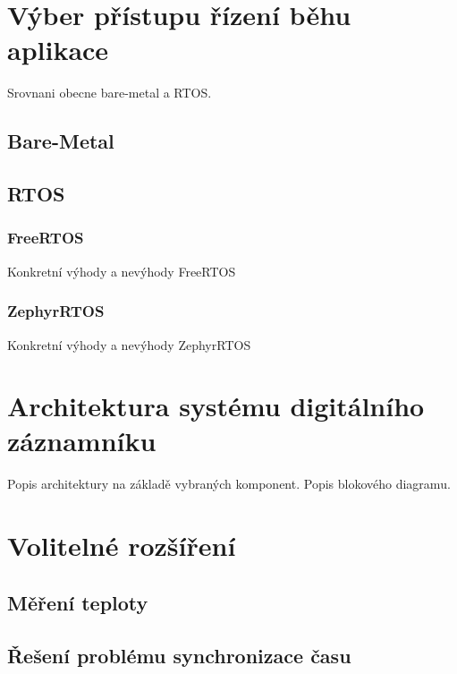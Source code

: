 \section{Výber přístupu řízení běhu aplikace}
Srovnani obecne bare-metal a RTOS.


\subsection{Bare-Metal}

\subsection{RTOS}
\subsubsection{FreeRTOS}
Konkretní výhody a nevýhody FreeRTOS

\subsubsection{ZephyrRTOS}
Konkretní výhody a nevýhody ZephyrRTOS


\section{Architektura systému digitálního záznamníku}
Popis architektury na základě vybraných komponent. Popis blokového diagramu.


\section{Volitelné rozšíření}
\subsection{Měření teploty}


\subsection{Řešení problému synchronizace času}

